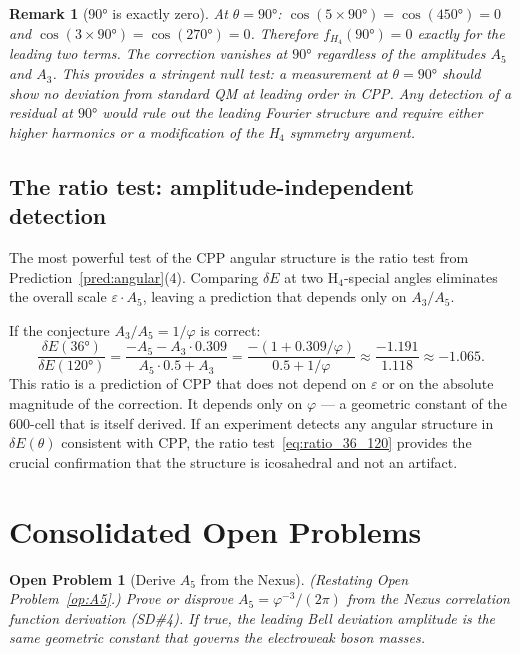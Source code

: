 \documentclass[11pt,a4paper]{article}
\newtheorem{remark}[theorem]{Remark}
\newtheorem{openprob}[theorem]{Open Problem}
\newcommand{\phig}{\varphi}
\newcommand{\eps}{\varepsilon}
\begin{document}
\begin{remark}[90° is exactly zero]
At $\theta = 90°$: $\cos(5\times90°) = \cos(450°) = 0$ and
$\cos(3\times90°) = \cos(270°) = 0$.  Therefore $f_{H_4}(90°) = 0$
\emph{exactly} for the leading two terms.  The correction vanishes at
$90°$ regardless of the amplitudes $A_5$ and $A_3$.  This provides
a stringent null test: a measurement at $\theta = 90°$ should show
\emph{no deviation} from standard QM at leading order in CPP.  Any
detection of a residual at $90°$ would rule out the leading Fourier
structure and require either higher harmonics or a modification of
the H$_4$ symmetry argument.
\end{remark}

\subsection{The ratio test: amplitude-independent detection}

The most powerful test of the CPP angular structure is the ratio test
from Prediction~\ref{pred:angular}(4).  Comparing $\delta E$ at two
H$_4$-special angles eliminates the overall scale $\eps \cdot A_5$,
leaving a prediction that depends only on $A_3/A_5$.

If the conjecture $A_3/A_5 = 1/\phig$ is correct:
\begin{equation}
\frac{\delta E(36°)}{\delta E(120°)}
= \frac{-A_5 - A_3\cdot0.309}{A_5\cdot0.5 + A_3}
= \frac{-(1 + 0.309/\phig)}{0.5 + 1/\phig}
\approx \frac{-1.191}{1.118} \approx -1.065.
\label{eq:ratio_36_120}
\end{equation}
This ratio is a prediction of CPP that does not depend on $\eps$ or
on the absolute magnitude of the correction.  It depends only on
$\phig$ --- a geometric constant of the 600-cell that is itself
derived.  If an experiment detects any angular structure in $\delta
E(\theta)$ consistent with CPP, the ratio test~\eqref{eq:ratio_36_120}
provides the crucial confirmation that the structure is icosahedral
and not an artifact.

\section{Consolidated Open Problems}

\begin{openprob}[Derive $A_5$ from the Nexus]
(Restating Open Problem~\ref{op:A5}.)
Prove or disprove $A_5 = \phig^{-3}/(2\pi)$ from the Nexus
correlation function derivation (SD\#4).  If true, the leading Bell
deviation amplitude is the same geometric constant that governs the
electroweak boson masses.
\end{openprob}
\end{document}
